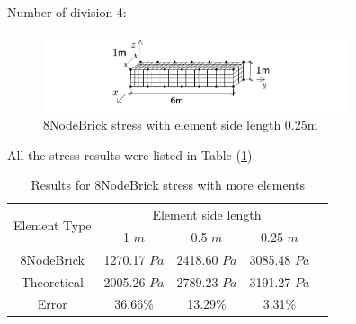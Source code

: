 \documentclass[fleqn,11pt]{article}
\begin{document}
Number of division 4:

\begin{figure}[H]
  \centering
  \includegraphics[width=9cm]{../Figure-files/beam_8brick_more.pdf}
  \caption{8NodeBrick stress with element side length 0.25m}
  \label{fig 8NodeBrick stress with element side length 0.25m}
\end{figure}


All the stress results were listed in Table (\ref{table Results for 8NodeBrick stress with more elements}). 


\begin{table}[H]
  \centering
  \caption{Results for 8NodeBrick stress with more elements}
  \label{table Results for 8NodeBrick stress with more elements}
  \begin{tabular}{|c|c|c|c|c|}
    \hline 
    \multirow{2}{*}{Element Type} 
       & \multicolumn{3}{|c|}{Element side length} \\ \cline{2-4}
       & 1 $m$ & 0.5 $m$ & 0.25 $m$ \\                              \hline
8NodeBrick & 1270.17 $Pa$ & 2418.60 $Pa$ & 3085.48 $Pa$ \\ \hline
Theoretical & 2005.26 $Pa$ & 2789.23 $Pa$ & 3191.27 $Pa$ \\ \hline
Error      & 36.66\% & 13.29\% & 3.31\%  \\ \hline
  \end{tabular}
\end{table}
\end{document}
